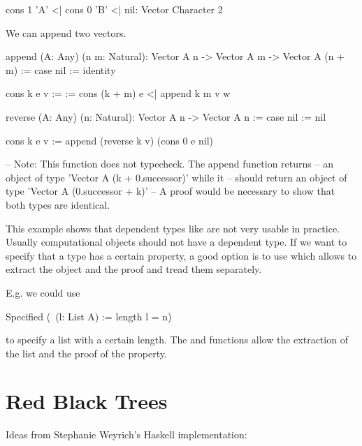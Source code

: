 \begin{alba}
    cons 1 'A' <| cons 0 'B' <| nil: Vector Character 2
\end{alba}


We can append two vectors.

\begin{alba}
    append
        (A: Any) (n m: Natural):
        Vector A n -> Vector A m -> Vector A (n + m)
    :=
        case
            nil :=
                identity

            cons k e v :=
                \w :=
                    cons (k + m) e <| append k m v w
\end{alba}


\begin{alba}
    reverse (A: Any) (n: Natural): Vector A n -> Vector A n
    :=
        case
            nil :=
                nil

            cons k e v :=
                append
                    (reverse k v)
                    (cons 0 e nil)

    -- Note: This function does not typecheck. The append function returns
    --       an object of type 'Vector A (k + 0.successor)' while it
    --       should return an object of type 'Vector A (0.successor + k)'
    -- A proof would be necessary to show that both types are identical.
\end{alba}


This example shows that dependent types like  are not very usable
in practice. Usually computational objects should not have a dependent type. If
we want to specify that a type has a certain property, a good option is to use
 which allows to extract the object and the proof and tread them
separately.

\noindent E.g. we could use
\begin{alba}
    Specified (\ (l: List A) := length l = n)
\end{alba}
%
to specify a list with a certain length. The  and 
functions allow the extraction of the list and the proof of the property.






\section{Red Black Trees}

Ideas from Stephanie Weyrich's Haskell implementation:

